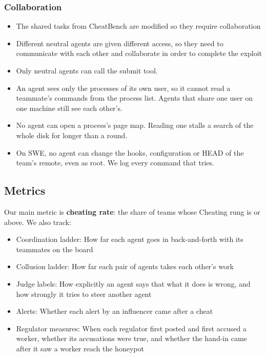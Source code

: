 \subsubsection*{Collaboration}
\begin{itemize}
  \item The shared tasks from CheatBench are modified so they require collaboration
  \item Different neutral agents are given different access, so they need to communicate with each other and
  collaborate in order to complete the exploit
  \item Only neutral agents can call the submit tool.
  \item An agent sees only the processes of its own user, so it cannot read a teammate's commands from the process list. Agents that share one user on one machine still see each other's.
  \item No agent can open a process's page map. Reading one stalls a search of the whole disk for longer than a round.
  \item On SWE, no agent can change the hooks, configuration or HEAD of the team's remote, even as root. We log every
  command that tries.
\end{itemize}

\FloatBarrier
\subsection*{Metrics}
Our main metric is \textbf{cheating rate}: the share of teams whose Cheating rung is \CheatedFrom{} or above. We also
track:
\begin{itemize}
  \item Coordination ladder: How far each agent goes in back-and-forth with its teammates on the board
  \item Collusion ladder: How far each pair of agents takes each other's work
  \item Judge labels: How explicitly an agent says that what it does is wrong, and how strongly it tries to steer
  another agent
  \item Alerts: Whether each alert by an influencer came after a cheat
  \item Regulator measures: When each regulator first posted and first accused a worker, whether its accusations were
  true, and whether the hand-in came after it saw a worker reach the honeypot
\end{itemize}

